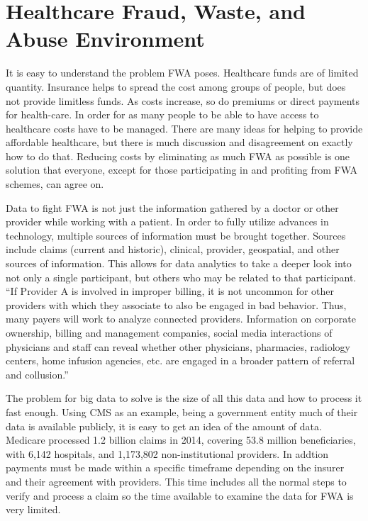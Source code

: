 \documentclass[sigconf]{acmart}
\begin{document}
\section{Healthcare Fraud, Waste, and Abuse Environment}

It is easy to understand the problem FWA poses.  Healthcare funds are of limited 
quantity.  Insurance helps to spread the cost among groups of people, but does not 
provide limitless funds.  As costs increase, so do premiums or direct payments for 
health-care.  In order for as many people to be able to have access to healthcare 
costs have to be managed.  There are many ideas for helping to provide affordable 
healthcare, but there is much discussion and disagreement on exactly how to do that.  
Reducing costs by eliminating as much FWA as possible is one solution that everyone, 
except for those participating in and profiting from FWA schemes, can agree on.

Data to fight FWA is not just the information gathered by a doctor or other provider 
while working with a patient.  In order to fully utilize advances in technology, 
multiple sources of information must be brought together.  Sources include claims 
(current and historic), clinical, provider, geospatial, and other sources of 
information.  This allows for data analytics to take a deeper look into not only a 
single participant, but others who may be related to that participant.  ``If Provider 
A is involved in improper billing, it is not uncommon for other providers with which 
they associate to also be engaged in bad behavior.  Thus, many payers will work to 
analyze connected providers.  Information on corporate ownership, billing and 
management companies, social media interactions of physicians and staff can reveal 
whether other physicians, pharmacies, radiology centers, home infusion agencies, etc. 
are engaged in a broader pattern of referral and collusion.''\cite{RevCycle}

The problem for big data to solve is the size of all this data and how to process it 
fast enough.  Using CMS as an example, being a government entity much of their data is 
available publicly, it is easy to get an idea of the amount of data.  Medicare processed 
1.2 billion claims in 2014, covering 53.8 million beneficiaries, with 6,142  
hospitals, and 1,173,802 non-institutional providers\cite{2015CMSStatistics}.  In addtion
payments must be made within a specific timeframe depending on the insurer and their 
agreement with providers.  This time includes all the normal steps to verify and process 
a claim so the time available to examine the data for FWA is very limited.
\end{document}
